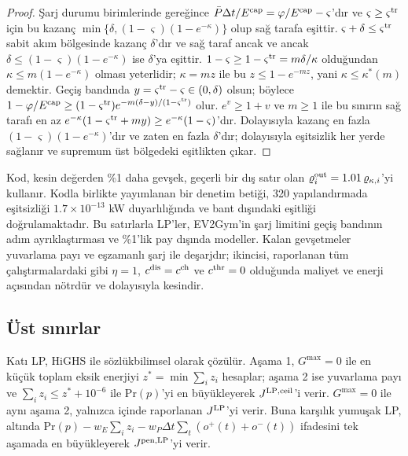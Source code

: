 \begin{proof}
Şarj durumu birimlerinde  gereğince $\bar P\Delta t/E^{\mathrm{cap}}=\varphi/E^{\mathrm{cap}}-\varsigma$'dır ve $\varsigma\ge\varsigma^{\mathrm{tr}}$ için bu kazanç $\min\{\delta,(1-\varsigma)(1-e^{-\kappa})\}$ olup sağ tarafa eşittir.
$\varsigma+\delta\le\varsigma^{\mathrm{tr}}$ sabit akım bölgesinde kazanç $\delta$'dır ve sağ taraf ancak ve ancak $\delta\le(1-\varsigma)(1-e^{-\kappa})$ ise $\delta$'ya eşittir.
$1-\varsigma\ge1-\varsigma^{\mathrm{tr}}=m\delta/\kappa$ olduğundan $\kappa\le m(1-e^{-\kappa})$ olması yeterlidir; $\kappa=mz$ ile bu $z\le1-e^{-mz}$, yani $\kappa\le\kappa^{*}(m)$ demektir.
Geçiş bandında $y=\varsigma^{\mathrm{tr}}-\varsigma\in(0,\delta)$ olsun; böylece $1-\varphi/E^{\mathrm{cap}}\ge(1-\varsigma^{\mathrm{tr}})e^{-m(\delta-y)/(1-\varsigma^{\mathrm{tr}})}$ olur.
$e^{v}\ge1+v$ ve $m\ge1$ ile bu sınırın sağ tarafı en az $e^{-\kappa}(1-\varsigma^{\mathrm{tr}}+my)\ge e^{-\kappa}(1-\varsigma)$'dır.
Dolayısıyla kazanç en fazla $(1-\varsigma)(1-e^{-\kappa})$'dır ve zaten en fazla $\delta$'dır; dolayısıyla eşitsizlik her yerde sağlanır ve supremum üst bölgedeki eşitlikten çıkar.
\end{proof}

Kod, kesin değerden \%1 daha gevşek, geçerli bir dış satır olan $\varrho_i^{\mathrm{out}}=1.01\,\varrho_{\kappa,i}$'yi kullanır.
Kodla birlikte yayımlanan bir denetim betiği, 320 yapılandırmada eşitsizliği $1.7\times10^{-13}$ kW duyarlılığında ve bant dışındaki eşitliği doğrulamaktadır.
Bu satırlarla LP'ler, EV2Gym'in şarj limitini geçiş bandının adım ayrıklaştırması ve \%1'lik pay dışında modeller.
Kalan gevşetmeler yuvarlama payı ve eşzamanlı şarj ile deşarjdır; ikincisi, raporlanan tüm çalıştırmalardaki gibi $\eta=1$, $c^{\mathrm{dis}}=c^{\mathrm{ch}}$ ve $c^{\mathrm{thr}}=0$ olduğunda maliyet ve enerji açısından nötrdür ve dolayısıyla kesindir.

\subsection{Üst sınırlar}\label{app:bounds}

Katı LP, HiGHS \cite{huangfu2018parallelizing} ile sözlükbilimsel olarak çözülür.
Aşama 1, $G^{\max}=0$ ile en küçük toplam eksik enerjiyi $z^{*}=\min\sum_iz_i$ hesaplar; aşama 2 ise yuvarlama payı ve $\sum_iz_i\le z^{*}+10^{-6}$ ile $\mathrm{Pr}(p)$'yi en büyükleyerek $J^{\mathrm{LP,ceil}}$'i verir.
$G^{\max}=0$ ile aynı aşama 2, yalnızca  içinde raporlanan $J^{\mathrm{LP}}$'yi verir.
Buna karşılık yumuşak LP,  altında $\mathrm{Pr}(p)-w_E\sum_iz_i-w_P\Delta t\sum_t(o^{+}(t)+o^{-}(t))$ ifadesini tek aşamada en büyükleyerek $J^{\mathrm{pen,LP}}$'yi verir.

